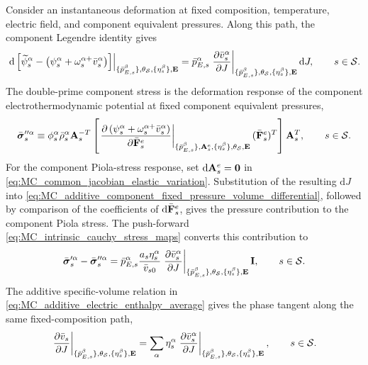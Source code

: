 Consider an instantaneous deformation at fixed composition, temperature,
electric field, and component equivalent pressures.  Along this path, the
component Legendre identity gives
%
\begin{equation}
	\left.
	\mathrm d
	\left[
	\widetilde\psi_s^\alpha
	-
	\left(
	\psi_s^\alpha+\omega_s^{\alpha+}\bar v_s^\alpha
	\right)
	\right]
	\right\vert_{
		\{\bar p_{E,s}^\beta\},\theta_{\mathcal{S}},
		\{\eta_s^\beta\},\mathbf{E}
	}
	=
	\bar p_{E,s}^\alpha
	\left.
	\frac{\partial \bar v_s^\alpha}{\partial J}
	\right\vert_{
		\{\bar p_{E,s}^\beta\},\theta_{\mathcal{S}},
		\{\eta_s^\beta\},\mathbf{E}
	}
	\mathrm dJ,
	\qquad
	s\in\mathcal{S} .
	\label{eq:MC_additive_component_fixed_pressure_volume_differential}
\end{equation}
%
The double-prime component stress is the deformation response of the component
electrothermodynamic potential at fixed component equivalent pressures,
%
\begin{equation}
	\bar{\boldsymbol{\sigma}}_s^{\prime\prime\alpha}
	\equiv
	\phi_s^\alpha\bar\rho_s^\alpha
	\mathbf{A}_s^{-T}
	\left[
	\left.
	\frac{\partial 
		\left(
		\psi_s^\alpha+\omega_s^{\alpha+}\bar v_s^\alpha
		\right)
	}{\partial \bar{\mathbf{F}}_s^e}
	\right\vert_{
		\{\bar p_{E,s}^\beta\},\mathbf{A}_s^e,
		\{\eta_s^\beta\},\theta_{\mathcal{S}},\mathbf{E}
	}
	(\bar{\mathbf{F}}_s^e)^T
	\right]
	\mathbf{A}_s^T,
	\qquad
	s\in\mathcal{S} .
	\label{eq:MC_additive_component_double_prime_stress}
\end{equation}
%
For the component Piola-stress response, set
\(\mathrm d\mathbf{A}_s^e=\mathbf{0}\) in
\eqref{eq:MC_common_jacobian_elastic_variation}.  Substitution of the resulting
\(\mathrm dJ\) into
\eqref{eq:MC_additive_component_fixed_pressure_volume_differential}, followed
by comparison of the coefficients of
\(\mathrm d\bar{\mathbf{F}}_s^e\), gives the pressure contribution to the
component Piola stress.  The push-forward
\eqref{eq:MC_intrinsic_cauchy_stress_maps} converts this contribution to
%
\begin{equation}
	\bar{\boldsymbol{\sigma}}_s^{\prime\alpha}
	-
	\bar{\boldsymbol{\sigma}}_s^{\prime\prime\alpha}
	=
	\bar p_{E,s}^\alpha
	\frac{a_s\eta_s^\alpha}{\bar v_{s0}}
	\left.
	\frac{\partial \bar v_s^\alpha}{\partial J}
	\right\vert_{
		\{\bar p_{E,s}^\beta\},\theta_{\mathcal{S}},
		\{\eta_s^\beta\},\mathbf{E}
	}
	\mathbf{I},
	\qquad
	s\in\mathcal{S} .
	\label{eq:MC_additive_component_fixed_pressure_stress_difference}
\end{equation}
%
The additive specific-volume relation in
\eqref{eq:MC_additive_electric_enthalpy_average} gives the phase tangent along
the same fixed-composition path,
%
\begin{equation}
	\left.
	\frac{\partial \bar v_s}{\partial J}
	\right\vert_{
		\{\bar p_{E,s}^\beta\},\theta_{\mathcal{S}},
		\{\eta_s^\beta\},\mathbf{E}
	}
	=
	\sum_\alpha
	\eta_s^\alpha
	\left.
	\frac{\partial \bar v_s^\alpha}{\partial J}
	\right\vert_{
		\{\bar p_{E,s}^\beta\},\theta_{\mathcal{S}},
		\{\eta_s^\beta\},\mathbf{E}
	},
	\qquad
	s\in\mathcal{S} .
	\label{eq:MC_additive_specific_volume_path_identity}
\end{equation}
